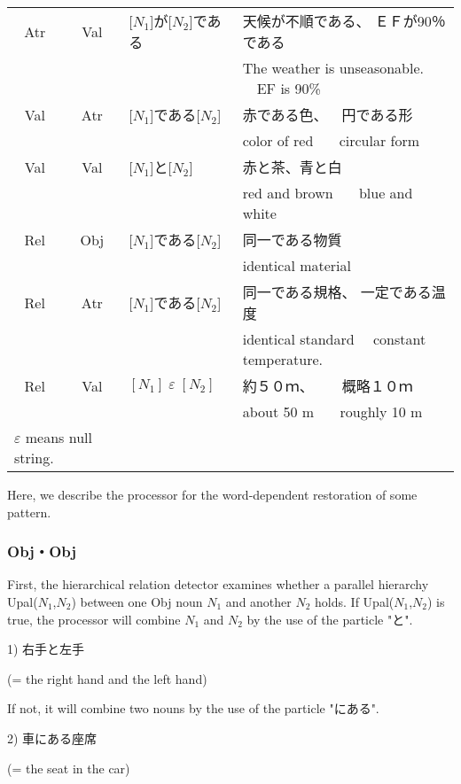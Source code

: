 \begin{table}
\begin{center}
\begin{tabular}{c|c|l|l}
 Atr  & Val & [$N_1$]が[$N_2$]である     & 天候が不順である、\hspace{5em}
ＥＦが90％である\\
     &     &                      & The weather is unseasonable. \ \ 
EF is 90\% \\
 Val  & Atr & [$N_1$]である[$N_2$]       & 赤である色、\ \ 
円である形\\
     &     &                      & color of red \ \ \ circular form\\
 Val  & Val & [$N_1$]と[$N_2$]           & 赤と茶、\hspace{4em}青と白\\
     &     &                      & red and brown \ \ \ blue and white\\
 Rel  & Obj & [$N_1$]である[$N_2$]       & 同一である物質\\
     &     &                      & identical material\\
 Rel  & Atr & [$N_1$]である[$N_2$]       & 同一である規格、\hspace{1em}
一定である温度\\
     &     &                      & identical standard \ \ 
constant temperature.\\
 Rel  & Val & $[N_1]\;\varepsilon\; [N_2]$  & 約５０ｍ、\ \ \ \ 概略１０ｍ\\
     &     &                      & about 50 m \ \ \ roughly 10 m\\
\hline
\multicolumn{2}{l}{\footnotesize $\varepsilon$ means null string.}\\
\end{tabular}
\end{center}
\end{table}

Here, we describe the processor for the word-dependent
restoration of some pattern.
\renewcommand{\thesubsubsection}{}
\subsubsection{Obj・Obj}
 First, the hierarchical relation detector examines whether a parallel
hierarchy Upal($N_1$,$N_2$) between one Obj noun $N_1$ and another
$N_2$ holds. If Upal($N_1$,$N_2$) is true, the processor will combine
$N_1$ and $N_2$ by the use of the particle "と".
\begin{list}{}{}
\item[1)] 右手と左手
\item (= the right hand and the left hand)
\end{list}
If not, it will combine two nouns by the use of the particle 
"にある".
\begin{list}{}{}
\item[2)] 車にある座席
\item (= the seat in the car)
\end{list}

